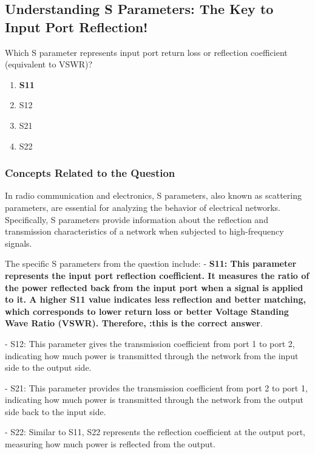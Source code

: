 \subsection{Understanding S Parameters: The Key to Input Port Reflection!}

\begin{tcolorbox}[colback=gray!10, colframe=black, title=E4B04] Which S parameter represents input port return loss or reflection coefficient (equivalent to VSWR)?

\begin{enumerate}[label=\Alph*.]
    \item \textbf{S11}
    \item S12
    \item S21
    \item S22
\end{enumerate} \end{tcolorbox}

\subsubsection*{Concepts Related to the Question}

In radio communication and electronics, S parameters, also known as scattering parameters, are essential for analyzing the behavior of electrical networks. Specifically, S parameters provide information about the reflection and transmission characteristics of a network when subjected to high-frequency signals.

The specific S parameters from the question include:
- \textbf{S11\textbf{: This parameter represents the input port reflection coefficient. It measures the ratio of the power reflected back from the input port when a signal is applied to it. A higher S11 value indicates less reflection and better matching, which corresponds to lower return loss or better Voltage Standing Wave Ratio (VSWR). Therefore, :}this is the correct answer}.
  
- S12: This parameter gives the transmission coefficient from port 1 to port 2, indicating how much power is transmitted through the network from the input side to the output side.

- S21: This parameter provides the transmission coefficient from port 2 to port 1, indicating how much power is transmitted through the network from the output side back to the input side.

- S22: Similar to S11, S22 represents the reflection coefficient at the output port, measuring how much power is reflected from the output.

